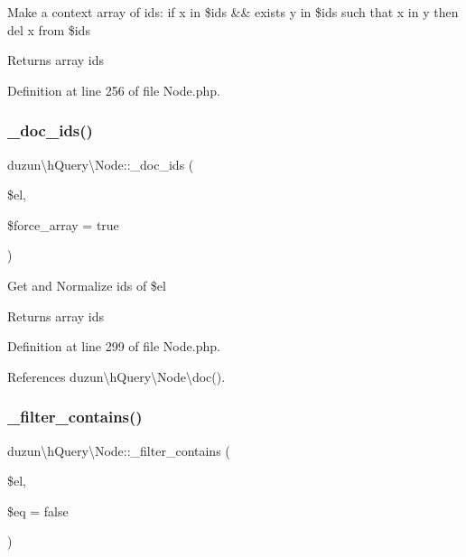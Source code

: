 Make a context array of ids\+: if x in \$ids \&\& exists y in \$ids such that x in y then del x from \$ids

\begin{DoxyReturn}{Returns}
array ids 
\end{DoxyReturn}


Definition at line 256 of file Node.\+php.

\mbox{\label{classduzun_1_1hQuery_1_1Node_a3d9fe0b2908818d7d8feef2e55405d03}} 
\subsubsection{\texorpdfstring{\+\_\+doc\+\_\+ids()}{\_doc\_ids()}}
{\footnotesize\ttfamily duzun\textbackslash{}h\+Query\textbackslash{}\+Node\+::\+\_\+doc\+\_\+ids (\begin{DoxyParamCaption}\item[{}]{\$el,  }\item[{}]{\$force\+\_\+array = {\ttfamily true} }\end{DoxyParamCaption})\hspace{0.3cm}{\ttfamily [protected]}}

Get and Normalize ids of \$el

\begin{DoxyReturn}{Returns}
array ids 
\end{DoxyReturn}


Definition at line 299 of file Node.\+php.



References duzun\textbackslash{}h\+Query\textbackslash{}\+Node\textbackslash{}doc().

\mbox{\label{classduzun_1_1hQuery_1_1Node_a4419fd0f30515d4eb5cad2bfe7979754}} 
\subsubsection{\texorpdfstring{\+\_\+filter\+\_\+contains()}{\_filter\_contains()}}
{\footnotesize\ttfamily duzun\textbackslash{}h\+Query\textbackslash{}\+Node\+::\+\_\+filter\+\_\+contains (\begin{DoxyParamCaption}\item[{}]{\$el,  }\item[{}]{\$eq = {\ttfamily false} }\end{DoxyParamCaption})}

